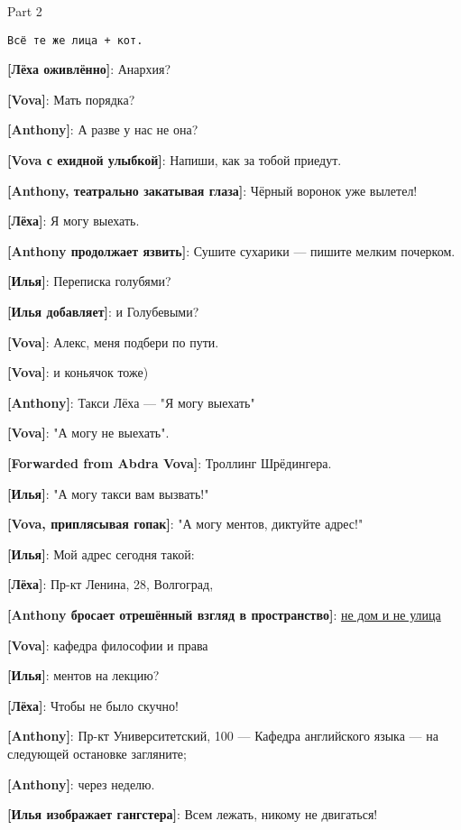 \begin{center}
    \large Part 2
\end{center}

{\small\texttt{Всё те же лица + кот.}}

\begin{flushleft}
\textbf{[Лёха оживлённо]}: Анархия?

\textbf{[Vova]}: Мать порядка?

\textbf{[Anthony]}: А разве у нас не она?

\textbf{[Vova с ехидной улыбкой]}: Напиши, как за тобой приедут.

\textbf{[Anthony, театрально закатывая глаза]}: Чёрный воронок уже вылетел!

\textbf{[Лёха]}: Я могу выехать.

\textbf{[Anthony продолжает язвить]}: Сушите сухарики --- пишите мелким почерком.

\textbf{[Илья]}: Переписка голубями?

\textbf{[Илья добавляет]}: и Голубевыми?

\textbf{[Vova]}: Алекс, меня подбери по пути.

\textbf{[Vova]}: и коньячок тоже)

\textbf{[Anthony]}: Такси Лёха --- "Я могу выехать"

\textbf{[Vova]}: "А могу не выехать".

\textbf{[Forwarded from Abdra Vova]}: Троллинг Шрёдингера.

\textbf{[Илья]}: "А могу такси вам вызвать!"

\textbf{[Vova, приплясывая гопак]}: "А могу ментов, диктуйте адрес!"

\textbf{[Илья]}: Мой адрес сегодня такой:

\textbf{[Лёха]}: Пр-кт Ленина, 28, Волгоград,

\textbf{[Anthony бросает отрешённый взгляд в пространство]}: \href{http://pine-forum.herokuapp.com/}{не дом и не улица}

\textbf{[Vova]}: кафедра философии и права

\textbf{[Илья]}: ментов на лекцию?

\textbf{[Лёха]}: Чтобы не было скучно!

\textbf{[Anthony]}: Пр-кт Университетский, 100 --- Кафедра английского языка --- на следующей остановке загляните;

\textbf{[Anthony]}: через неделю.

\textbf{[Илья изображает гангстера]}: Всем лежать, никому не двигаться!


\end{flushleft}
